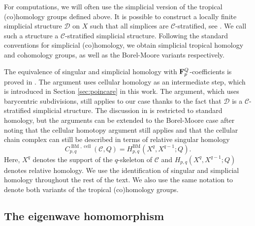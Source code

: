 \documentclass[11pt]{article}
\numberwithin{equation}{numsection}
\newcommand{\CC}{{\mathcal C}}
\newcommand{\DD}{\mathcal{D}}
\DeclareMathOperator{\BM}{BM}
\DeclareMathOperator{\cell}{cell}
\begin{document}
\begin{rem} \label{simplicialhomology}{\rm
  For computations, we will often use the simplicial version of the tropical  (co)homology groups defined above. 
	It is possible to construct a locally finite
	simplicial structure $\DD$ on $X$ such that all simplices are $\CC$-stratified, see  \cite[Section 2.2]{MikZhar}. 
	We call such a structure a $\CC$-stratified simplicial structure. 
	Following the standard conventions for simplicial (co)homology, we obtain
	simplicial tropical homology and cohomology  groups, as well as the Borel-Moore 
	variants respectively. 

	The equivalence of singular and simplicial homology with ${\bf F}_p^{Q}$-coefficients
	is proved in \cite[Section 2.2]{MikZhar}. 
	The argument uses cellular homology as an intermediate step, which is introduced
	in Section \ref{sec:poincare} in this work. 
	The argument, which uses barycentric subdivisions, still applies to our case thanks to 
	the fact that $\DD$ is a $\CC$-stratified simplicial structure. 
	The discussion in \cite{MikZhar} is restricted to  standard homology, but the arguments can 
	be extended to the Borel-Moore case after noting that the cellular homotopy argument still applies
	and that the cellular chain complex can still be described in terms of relative singular homology
	\[
		C_{p,q}^{\BM, \cell}(\CC, Q) = H_{p,q}^{\BM}(X^q, X^{q-1}; Q).
	\]
	Here, $X^q$ denotes the support of the $q$-skeleton of $\CC$ and $H_{p,q}(X^q, X^{q-1}; Q)$
	denotes relative homology.
	We use the identification of singular and simplicial homology throughout the rest of the text.
	We also use the same notation to denote both variants of the tropical (co)homology groups. }
\end{rem}




\subsection{The eigenwave homomorphism}
\end{document}
